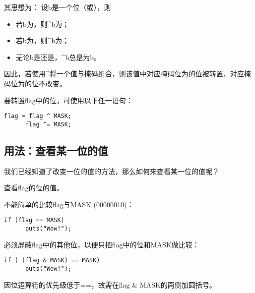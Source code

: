 \begin{frame}
  其思想为：  设{\tf b}是一个位（{}或{}），则
  \begin{itemize}
  \item 若{\tf b}为{}，则{\^{}b}为{}；
  \item 若{\tf b}为{}，则{\^{}b}为{}；
  \item 无论{\tf b}是{}还是{}，{\^{}b}总是为{\tf b}。
  \end{itemize}
  因此，若使用{\tf \^{}}将一个值与掩码组合，则该值中对应掩码位为{}的位被转置，对应掩码位为{}的位不改变。
\end{frame}

\begin{frame}[fragile]
  \begin{li}
    要转置{\tf flag}中的位{}，可使用以下任一语句：
    \begin{lstlisting}[backgroundcolor=\color{red!20}]
      flag = flag ^ MASK;
      flag ^= MASK;
    \end{lstlisting}
  \end{li}
\end{frame}

\subsection{用法：查看某一位的值}
\begin{frame}
  \begin{wenti}
    我们已经知道了改变一位的值的方法，那么如何来查看某一位的值呢？
  \end{wenti}
\end{frame}

\begin{frame}[fragile]
  \begin{li}
    查看{\tf flag}的位{}的值。
  \end{li}
  \pause \vspace{.1in}

  不能简单的比较{\tf flag}与{\tf MASK (00000010)}：
  \begin{lstlisting}[backgroundcolor=\color{red!20}]
    if (flag == MASK)
      puts("Wow!");
  \end{lstlisting}
  \pause \vspace{0.1in}
  
  必须屏蔽{\tf flag}中的其他位，以便只把{\tf flag}中的位{}和{\tf MASK}做比较：
  \begin{lstlisting}[backgroundcolor=\color{red!20}]
    if ( (flag & MASK) == MASK)
      puts("Wow!");
  \end{lstlisting}
  因位运算符的优先级低于{\tf ==}，故需在{\tf flag \& MASK}的两侧加圆括号。
\end{frame}

